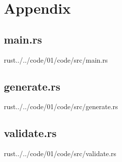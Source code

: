 \documentclass{article}
\begin{document}
\section*{Appendix}

\subsection*{main.rs}
\begin{inputminted}{rust}{../../code/01/code/src/main.rs}
\end{inputminted}

\subsection*{generate.rs}
\label{generate_code}
\begin{inputminted}{rust}{../../code/01/code/src/generate.rs}
\end{inputminted}

\subsection*{validate.rs}
\label{validate_code}
\begin{inputminted}{rust}{../../code/01/code/src/validate.rs}
\end{inputminted}
\end{document}
